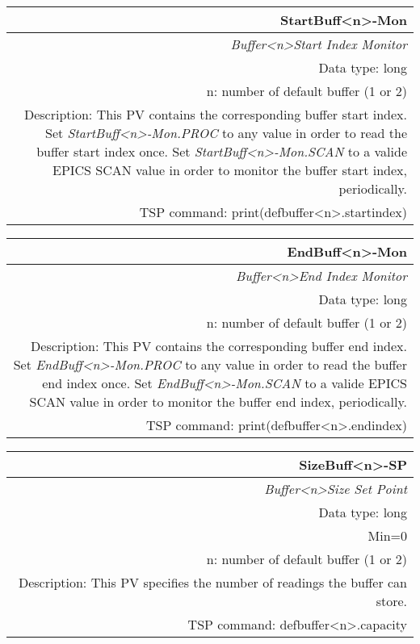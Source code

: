 \documentclass[openany]{article}
\begin{document}
		\begin{tabular}{N}
			\hline
			\bfseries StartBuff\textless n\textgreater-Mon\label{pv:startbuff-mon} \\ \hline
			\emph{Buffer\textless n\textgreater Start Index Monitor} \\
			Data type: long \\
			n: number of default buffer (1 or 2) \\
			Description: This PV contains the corresponding buffer start index. Set \emph{StartBuff\textless n\textgreater-Mon.PROC} to any value in order to read the buffer start index once. Set \emph{StartBuff\textless n\textgreater-Mon.SCAN} to a valide EPICS SCAN value in order to monitor the buffer start index, periodically. \\
			TSP command: print(defbuffer\textless n\textgreater.startindex)
		\end{tabular}

		\begin{tabular}{N}
			\hline
			\bfseries EndBuff\textless n\textgreater-Mon\label{pv:endbuff-mon} \\ \hline
			\emph{Buffer\textless n\textgreater End Index Monitor} \\
			Data type: long \\
			n: number of default buffer (1 or 2) \\
			Description: This PV contains the corresponding buffer end index. Set \emph{EndBuff\textless n\textgreater-Mon.PROC} to any value in order to read the buffer end index once. Set \emph{EndBuff\textless n\textgreater-Mon.SCAN} to a valide EPICS SCAN value in order to monitor the buffer end index, periodically. \\
			TSP command: print(defbuffer\textless n\textgreater.endindex)
		\end{tabular}

		\begin{tabular}{N}
			\hline
			\bfseries SizeBuff\textless n\textgreater-SP\label{pv:sizebuff-sp} \\ \hline
			\emph{Buffer\textless n\textgreater Size Set Point} \\
			Data type: long \\
			Min=0 \\
			n: number of default buffer (1 or 2) \\
			Description: This PV specifies the number of readings the buffer can store. \\
			TSP command: defbuffer\textless n\textgreater.capacity
		\end{tabular}
\end{document}
